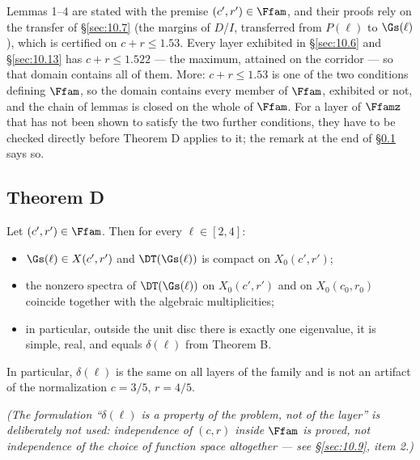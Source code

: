 Lemmas 1--4 are stated with the premise $(c',r')\in\Ffam$, and their proofs rely
on the transfer of \S\ref{sec:10.7} (the margins of $D$/$I$, transferred from $P(\ell)$
to $\Gs(\ell)$), which is certified on $c+r\le 1.53$. Every layer exhibited in
\S\ref{sec:10.6} and \S\ref{sec:10.13} has $c+r\le 1.522$ --- the maximum, attained on the
corridor --- so that domain contains all of them. More: $c+r\le 1.53$ is one of the two
conditions defining $\Ffam$, so the domain contains every member of $\Ffam$, exhibited
or not, and the chain of lemmas is closed on the whole of $\Ffam$. For a layer of $\Ffamz$
that has not been shown to satisfy the two further conditions, they have to be
checked directly before Theorem D applies to it; the remark at the end of \S\ref{sec:10.5} says so.


\subsection{Theorem D}
\label{sec:10.5}

\begin{namedtheorem}
\label{thm:D}
Let $(c',r') \in \Ffam$. Then for every
$\ell \in [2,4]$:
\begin{itemize}
\item[1.] $\Gs(\ell) \in X(c',r')$ and $\DT(\Gs(\ell))$ is compact on $X_0(c',r')$;
\item[2.] the nonzero spectra of $\DT(\Gs(\ell))$ on $X_0(c',r')$ and on $X_0(c_0,r_0)$
   coincide together with the algebraic multiplicities;
\item[3.] in particular, outside the unit disc there is exactly one eigenvalue, it
   is simple, real, and equals $\delta(\ell)$ from Theorem B.
\end{itemize}
In particular, $\delta(\ell)$ is the same on all layers of the family and is not
an artifact of the normalization $c = 3/5$, $r = 4/5$.
\end{namedtheorem}

\emph{(The formulation ``$\delta(\ell)$ is a property of the problem, not of the layer''
is deliberately not used: independence of $(c,r)$ inside $\Ffam$ is proved, not
independence of the choice of function space altogether --- see \S\ref{sec:10.9}, item 2.)}

